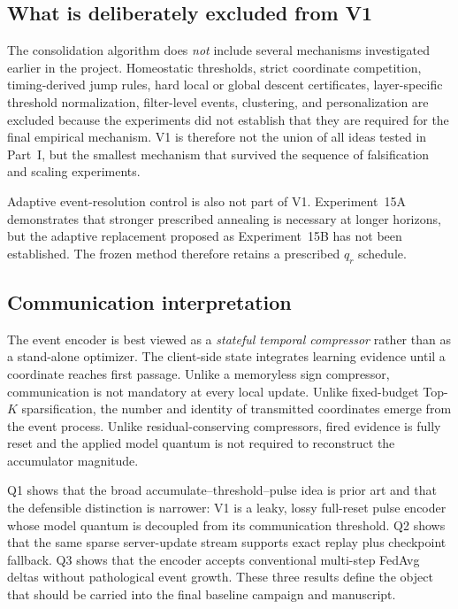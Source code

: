 \subsection{What is deliberately excluded from V1}

The consolidation algorithm does \emph{not} include several mechanisms investigated earlier in the project. Homeostatic thresholds, strict coordinate competition, timing-derived jump rules, hard local or global descent certificates, layer-specific threshold normalization, filter-level events, clustering, and personalization are excluded because the experiments did not establish that they are required for the final empirical mechanism. V1 is therefore not the union of all ideas tested in Part~I, but the smallest mechanism that survived the sequence of falsification and scaling experiments.

Adaptive event-resolution control is also not part of V1. Experiment~15A demonstrates that stronger prescribed annealing is necessary at longer horizons, but the adaptive replacement proposed as Experiment~15B has not been established. The frozen method therefore retains a prescribed $q_r$ schedule.

\subsection{Communication interpretation}

The event encoder is best viewed as a \emph{stateful temporal compressor} rather than as a stand-alone optimizer. The client-side state integrates learning evidence until a coordinate reaches first passage. Unlike a memoryless sign compressor, communication is not mandatory at every local update. Unlike fixed-budget Top-$K$ sparsification, the number and identity of transmitted coordinates emerge from the event process. Unlike residual-conserving compressors, fired evidence is fully reset and the applied model quantum is not required to reconstruct the accumulator magnitude.

Q1 shows that the broad accumulate--threshold--pulse idea is prior art and that the defensible distinction is narrower: V1 is a leaky, lossy full-reset pulse encoder whose model quantum is decoupled from its communication threshold. Q2 shows that the same sparse server-update stream supports exact replay plus checkpoint fallback. Q3 shows that the encoder accepts conventional multi-step FedAvg deltas without pathological event growth. These three results define the object that should be carried into the final baseline campaign and manuscript.
